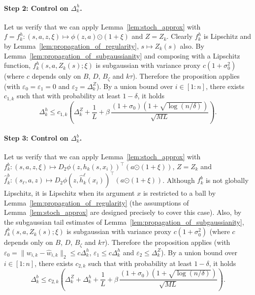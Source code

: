 \documentclass[a4paper,11pt]{article}
\newcommand{\1}{\mathbbm{1}}
\theoremstyle{definition}
\theoremstyle{remark}
\begin{document}
\paragraph{Step 2: Control on $\Delta^h_k$.} Let us verify that we can apply Lemma~\ref{lem:stoch_approx} with $f = f^h_k : (s, a, z{,\xi}) \mapsto \phi(z,a){\odot(1+\xi)}$ and $Z = Z_k$. Clearly
$f^h_k$ is Lipschitz and by Lemma~\ref{lem:propagation_of_regularity}, $s \mapsto Z_k(s)$ also. By Lemma~\ref{lem:propagation_of_subgaussianity} and
composing with a Lipschitz function, $f^h_k(s, a, Z_k(s){;\xi})$ is subgaussian with variance
proxy $c{(1+\sigma_0^2)}$ (where $c$ depends only on $B$, $D$, {$B_\zeta$} and $k\tau$). Therefore the
proposition applies (with $\varepsilon_0 = \varepsilon_1 = 0$ and
$\varepsilon_2 = \Delta^Z_k$). By a union bound over $i \in [1:n]$, there exists
$c_{1,k}$ such that with probability at least $1 - \delta$, it holds
\[
  \Delta^h_k
  \leq c_{1,k} \left(
    \Delta^Z_k + \frac{1}{L}
    + {\beta} \,\frac{{(1+\sigma_0)}(1 + \sqrt{\log(n/\delta)})}{\sqrt{ML}}
  \right).
\]

\paragraph{Step 3: Control on $\Delta^b_k$.} Let us verify that we can apply
Lemma~\ref{lem:stoch_approx} with $f^b_k : (s, a, z{,\xi}) \mapsto D_2\phi(z,h_k(s, x_i))^\top (a{\odot(1+\xi)})$,
$Z = Z_k$ and $\hat{f}^b_k : (s_\ell, a, z) \mapsto D_2\phi(z,\hat{h}^\ell_k(x_i))^\top (a{\odot(1+\xi)})$.
Although $f^b_k$ is not globally Lipschitz, it is Lipschitz when its argument $x$ is
restricted to a ball by Lemma~\ref{lem:propagation_of_regularity} (the assumptions of Lemma~\ref{lem:stoch_approx} are designed
precisely to cover this case). Also, by the subgaussian tail estimates of Lemma~\ref{lem:propagation_of_subgaussianity},
$f^b_k(s, a, Z_k(s){;\xi})$ is subgaussian with variance proxy $c{(1+\sigma_0^2)}$ (where $c$
depends only on $B$, $D$, ${B_\zeta}$ and $k\tau$). Therefore the proposition applies (with
$\varepsilon_0 = \|w_{i,k} - \hat{w}_{i,k}\|_2 \leq c\Delta^h_k$,
$\varepsilon_1 \leq c\Delta^h_k$ and $\varepsilon_2 \leq \Delta^Z_k$). By a union bound
over $i \in [1:n]$, there exists $c_{2,k}$ such that with probability at least $1 - \delta$,
it holds
\[
  \Delta^b_k
  \leq c_{2,k} \left(
    \Delta^Z_k + \Delta^h_k + \frac{1}{L}
    + {\beta}\,\frac{{(1+\sigma_0)}(1 + \sqrt{\log(n/\delta)})}{\sqrt{ML}}
  \right).
\]
\end{document}
